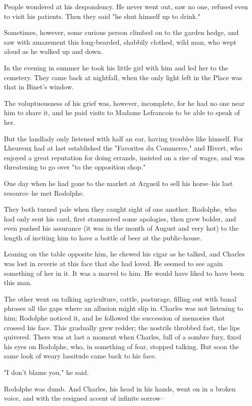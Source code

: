 \documentclass[11pt,twocolumn]{ltugboat}
\begin{document}
People wondered at his despondency. He never went out, saw no one,
refused even to visit his patients. Then they said "he shut himself up
to drink."

Sometimes, however, some curious person climbed on to the garden hedge,
and saw with amazement this long-bearded, shabbily clothed, wild man,
who wept aloud as he walked up and down.

In the evening in summer he took his little girl with him and led her to
the cemetery. They came back at nightfall, when the only light left in
the Place was that in Binet's window.

The voluptuousness of his grief was, however, incomplete, for he had no
one near him to share it, and he paid visits to Madame Lefrancois to be
able to speak of her.

But the landlady only listened with half an ear, having troubles
like himself. For Lheureux had at last established the "Favorites du
Commerce," and Hivert, who enjoyed a great reputation for doing errands,
insisted on a rise of wages, and was threatening to go over "to the
opposition shop."

One day when he had gone to the market at Argueil to sell his horse--his
last resource--he met Rodolphe.

They both turned pale when they caught sight of one another. Rodolphe,
who had only sent his card, first stammered some apologies, then grew
bolder, and even pushed his assurance (it was in the month of August and
very hot) to the length of inviting him to have a bottle of beer at the
public-house.

Leaning on the table opposite him, he chewed his cigar as he talked, and
Charles was lost in reverie at this face that she had loved. He seemed
to see again something of her in it. It was a marvel to him. He would
have liked to have been this man.

The other went on talking agriculture, cattle, pasturage, filling out
with banal phrases all the gaps where an allusion might slip in. Charles
was not listening to him; Rodolphe noticed it, and he followed the
succession of memories that crossed his face. This gradually grew
redder; the nostrils throbbed fast, the lips quivered. There was at
last a moment when Charles, full of a sombre fury, fixed his eyes on
Rodolphe, who, in something of fear, stopped talking. But soon the same
look of weary lassitude came back to his face.

"I don't blame you," he said.

Rodolphe was dumb. And Charles, his head in his hands, went on in a
broken voice, and with the resigned accent of infinite sorrow--
\end{document}
